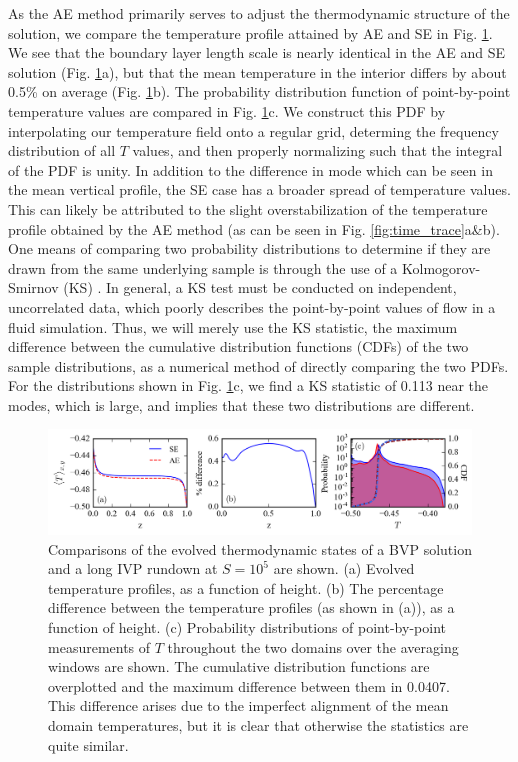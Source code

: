 \documentclass[aps, pre, onecolumn, nofootinbib, notitlepage, groupedaddress, amsfonts, amssymb, amsmath, longbibliography]{revtex4-1}
\begin{document}
As the AE method primarily serves to adjust the thermodynamic structure of the
solution, we compare the temperature profile attained by AE and SE in 
Fig. \ref{fig:temp_comparison}.  We see that the boundary layer length scale is 
nearly identical in the AE and SE solution (Fig. \ref{fig:temp_comparison}a), but that
the mean temperature in the interior differs by about 0.5\% on average
(Fig. \ref{fig:temp_comparison}b). The probability distribution function of point-by-point
temperature values are compared in Fig. \ref{fig:temp_comparison}c.  We construct
this PDF by interpolating our temperature field onto a regular grid, determing the
frequency distribution of all $T$ values, and then properly normalizing such that
the integral of the PDF is unity.  In addition to the
difference in mode which can be seen in the mean vertical profile, the SE case
has a broader spread of temperature values.  This can likely be attributed to the
slight overstabilization of the temperature profile obtained by the AE method
(as can be seen in Fig. \ref{fig:time_trace}a\&b).  One means of comparing two
probability distributions to determine if they are drawn from the same underlying
sample is through the use of a Kolmogorov-Smirnov (KS) \cite{wall&jenkins2012}.
In general, a KS test must be conducted on independent, uncorrelated data, which
poorly describes the point-by-point values of flow in a fluid simulation. Thus,
we will merely use the KS statistic, the maximum difference
between the cumulative distribution functions (CDFs) of the two sample distributions,
as a numerical method of directly comparing the two PDFs.  For the distributions
shown in Fig. \ref{fig:temp_comparison}c,
we find a KS statistic of 0.113 near the modes, which is large, and implies that
these two distributions are different.




\begin{figure}[t]
\includegraphics[width=\textwidth]{./figs/temp_comparison.png}
\caption{Comparisons of the evolved thermodynamic states of a BVP solution and a long IVP rundown at
$S = 10^{5}$ are shown.  (a) Evolved temperature profiles, as a function of height.
(b) The percentage difference between the temperature profiles (as shown in (a)), as a function of height.
(c) Probability distributions of point-by-point measurements of $T$ throughout the two domains over the
averaging windows are shown.  The cumulative distribution functions are overplotted and the maximum
difference between them in 0.0407. This difference arises due to the imperfect alignment of the
mean domain temperatures, but it is clear that otherwise the statistics are quite similar.
\label{fig:temp_comparison} }
\end{figure}
\end{document}
